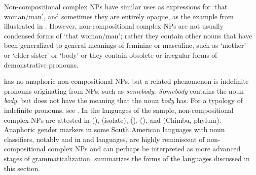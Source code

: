 \documentclass[output=collectionpaper]{langsci/langscibook}
\begin{document}
Non-compositional complex NPs have similar uses as expressions for ‘that woman\slash man’, and sometimes they are entirely opaque, as the example from  illustrated in . However, non-compositional complex NPs are not usually condensed forms of ‘that woman/man’; rather they contain other nouns that have been generalized to general meanings of feminine or masculine, such as ‘mother’ or ‘elder sister’ or ‘body’ or they contain obsolete or irregular forms of demonstrative pronouns.

 has no anaphoric non-compositional NPs, but a related phenomenon is indefinite pronouns originating from NPs, such as \textit{somebody}. \textit{Somebody} contains the noun \textit{body}, but does not have the meaning that the noun \textit{body} has. For a typology of indefinite pronouns, see \citet{Haspelmath1997}. In the languages of the sample, non-compositional complex NPs are attested in  (),  (isolate),  (),  (),  and  (Chimbu,  phylum). Anaphoric gender markers in some South American languages with noun classifiers, notably  and in  and  languages, are highly reminiscent of non-compositional complex NPs and can perhaps be interpreted as more advanced stages of grammaticalization.  summarizes the forms of the languages discussed in this section.
\end{document}
